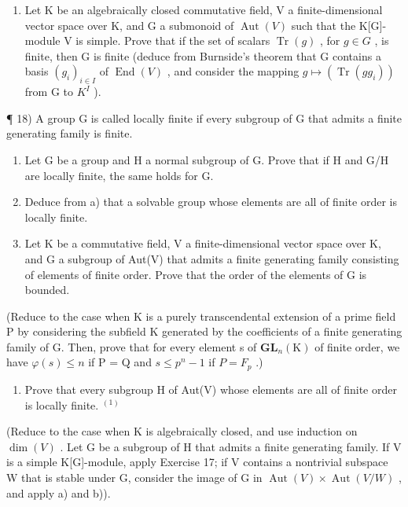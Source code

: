 \begin{enumerate}
\def\labelenumi{\arabic{enumi})}
\setcounter{enumi}{16}
\tightlist
\item
  Let K be an algebraically closed commutative field, V a finite-dimensional vector space over K, and G a submonoid of \(\operatorname{Aut}(V)\) such that the K{[}G{]}-module V is simple. Prove that if the set of scalars \(\operatorname{Tr}(g)\) , for \(g \in G\) , is finite, then G is finite (deduce from Burnside's theorem that G contains a basis \((g_{i})_{i \in I}\) of \(\operatorname{End}(V)\) , and consider the mapping \(g \mapsto (\operatorname{Tr}(gg_{i}))\) from G to \(K^{I}\) ).
\end{enumerate}

¶ 18) A group G is called locally finite if every subgroup of G that admits a finite generating family is finite.

\begin{enumerate}
\def\labelenumi{\alph{enumi})}
\item
  Let G be a group and H a normal subgroup of G. Prove that if H and G/H are locally finite, the same holds for G.
\item
  Deduce from a) that a solvable group whose elements are all of finite order is locally finite.
\item
  Let K be a commutative field, V a finite-dimensional vector space over K, and G a subgroup of Aut(V) that admits a finite generating family consisting of elements of finite order. Prove that the order of the elements of G is bounded.
\end{enumerate}

(Reduce to the case when K is a purely transcendental extension of a prime field P by considering the subfield K generated by the coefficients of a finite generating family of G. Then, prove that for every element s of \(\mathbf{GL}_{n}(\mathrm{K})\) of finite order, we have \(\varphi(s) \leqslant n\) if P = Q and \(s \leqslant p^{n} - 1\) if \(P = F_{p}\) .)

\begin{enumerate}
\def\labelenumi{\alph{enumi})}
\setcounter{enumi}{3}
\tightlist
\item
  Prove that every subgroup H of Aut(V) whose elements are all of finite order is locally finite. \(^{(1)}\)
\end{enumerate}

(Reduce to the case when K is algebraically closed, and use induction on \(\dim(V)\) . Let G be a subgroup of H that admits a finite generating family. If V is a simple K{[}G{]}-module, apply Exercise 17; if V contains a nontrivial subspace W that is stable under G, consider the image of G in \(\operatorname{Aut}(V) \times \operatorname{Aut}(V/W)\) , and apply a) and b)).

